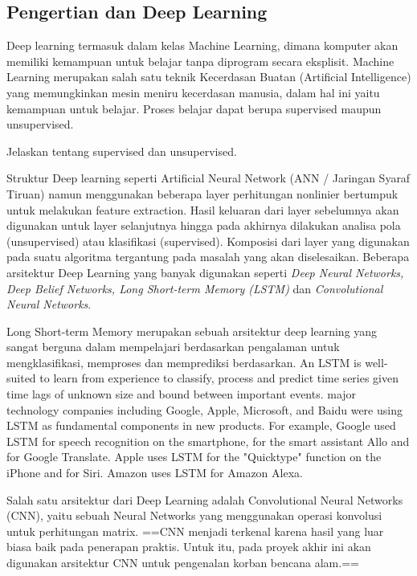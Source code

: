 \subsection{Pengertian dan Deep Learning}
Deep learning termasuk dalam kelas Machine Learning, dimana komputer akan memiliki kemampuan untuk belajar tanpa diprogram secara eksplisit. Machine Learning merupakan salah satu teknik Kecerdasan Buatan (Artificial Intelligence) yang memungkinkan mesin meniru kecerdasan manusia, dalam hal ini yaitu kemampuan untuk belajar. Proses belajar dapat berupa supervised maupun unsupervised. 

Jelaskan tentang supervised dan unsupervised.

Struktur Deep learning seperti Artificial Neural Network (ANN / Jaringan Syaraf Tiruan) namun menggunakan beberapa layer perhitungan nonlinier bertumpuk  untuk melakukan feature extraction. Hasil keluaran dari layer sebelumnya akan digunakan untuk layer selanjutnya hingga pada akhirnya dilakukan analisa pola (unsupervised) atau klasifikasi (supervised). Komposisi dari layer yang digunakan pada suatu algoritma tergantung pada masalah yang akan diselesaikan. Beberapa arsitektur Deep Learning yang banyak digunakan seperti \textit{Deep Neural Networks, Deep Belief Networks, Long Short-term Memory (LSTM)} dan \textit{Convolutional Neural Networks}.

Long Short-term Memory merupakan sebuah arsitektur deep learning yang sangat berguna dalam mempelajari berdasarkan pengalaman untuk mengklasifikasi, memproses dan memprediksi berdasarkan. An LSTM is well-suited to learn from experience to classify, process and predict time series given time lags of unknown size and bound between important events. major technology companies including Google, Apple, Microsoft, and Baidu were using LSTM as fundamental components in new products. For example, Google used LSTM for speech recognition on the smartphone, for the smart assistant Allo and for Google Translate. Apple uses LSTM for the "Quicktype" function on the iPhone and for Siri. Amazon uses LSTM for Amazon Alexa.


Salah satu arsitektur dari Deep Learning adalah Convolutional Neural Networks (CNN), yaitu sebuah Neural Networks yang menggunakan operasi konvolusi untuk perhitungan matrix. ==CNN menjadi terkenal karena hasil yang luar biasa baik pada penerapan praktis. Untuk itu, pada proyek akhir ini akan digunakan arsitektur CNN untuk pengenalan korban bencana alam.==

